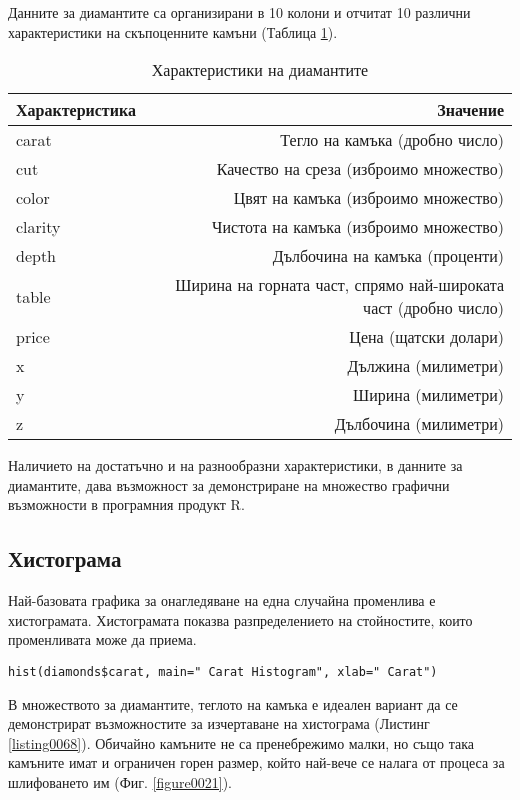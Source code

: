 Данните за диамантите са организирани в 10 колони и отчитат 10 различни характеристики на скъпоценните камъни (Таблица \ref{table0002}). 

\begin{table}[h!]
\centering
\begin{tabular}{|l|r|} 
  \rowcolor{lightgray}
  \hline
  Характеристика & Значение \\ [0.1ex] 
  \hline\hline
  carat & Тегло на камъка (дробно число) \\
  \hline
  cut & Качество на среза (изброимо множество) \\
  \hline
  color & Цвят на камъка (изброимо множество) \\
  \hline
  clarity & Чистота на камъка (изброимо множество) \\
  \hline
  depth & Дълбочина на камъка (проценти) \\
  \hline
  table & Ширина на горната част, спрямо най-широката част (дробно число) \\
  \hline
  price & Цена (щатски долари) \\
  \hline
  x & Дължина (милиметри) \\
  \hline
  y & Ширина (милиметри) \\
  \hline
  z & Дълбочина (милиметри) \\
  \hline
\end{tabular}
\caption{Характеристики на диамантите}
\label{table0002}
\end{table}

Наличието на достатъчно и на разнообразни характеристики, в данните за диамантите, дава възможност за демонстриране на множество графични възможности в програмния продукт R.

\subsection{Хистограма}

Най-базовата графика за онагледяване на една случайна променлива е хистограмата. Хистограмата показва разпределението на стойностите, които променливата може да приема. 

\begin{lstlisting}[caption=Генериране на хистограма за теглото на камъните, label=listing0068]
hist(diamonds$carat, main=" Carat Histogram", xlab=" Carat")
\end{lstlisting}

В множеството за диамантите, теглото на камъка е идеален вариант да се демонстрират възможностите за изчертаване на хистограма (Листинг \ref{listing0068}). Обичайно камъните не са пренебрежимо малки, но също така камъните имат и ограничен горен размер, който най-вече се налага от процеса за шлифоването им (Фиг. \ref{figure0021}). 

